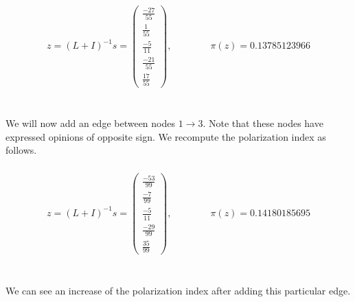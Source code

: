 \begin{equation}
	\begin{aligned}
		z=(L+I)^{-1}s=
		\left(\begin{matrix}
		\frac{-27}{55} \\
		\frac{1}{55} \\
		\frac{-5}{11} \\
		\frac{-21}{55} \\
		\frac{17}{55}
		\end{matrix}\right),
		\qquad \qquad
		\pi(z)= 0.13785123966
	\end{aligned}
\end{equation}
\\
\\
We will now add an edge between nodes $1\rightarrow3$. Note that these nodes have expressed opinions of opposite sign. We recompute the polarization index as follows.
\\
\\
\begin{equation}
	\begin{aligned}
		z=(L+I)^{-1}s=
		\left(\begin{matrix}
		\frac{-53}{99} \\
		\frac{-7}{99} \\
		\frac{-5}{11} \\
		\frac{-29}{99} \\
		\frac{35}{99}
		\end{matrix}\right),
		\qquad \qquad
		\pi(z) = 0.14180185695
	\end{aligned}
\end{equation}
\\
\\
We can see an increase of the polarization index after adding this particular edge.

\clearpage

